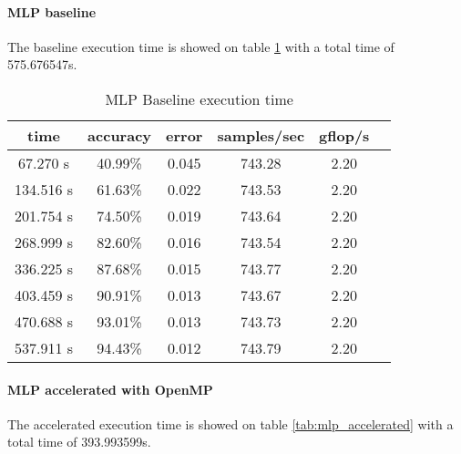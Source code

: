 \documentclass[11pt]{article}
\begin{document}
\paragraph*{MLP baseline} The baseline execution time is showed on table \ref{tab:mlp_baseline} with a total time of 575.676547s.

\begin{table}[h]	\centering
	\begin{tabular}{|c|c|c|c|c|c|}
		\hline
		\textbf{time} & \textbf{accuracy} & \textbf{error} & \textbf{samples/sec} & \textbf{gflop/s} \\ \hline
		67.270 s      & 40.99\%           & 0.045          & 743.28               & 2.20             \\ \hline
		134.516 s     & 61.63\%           & 0.022          & 743.53               & 2.20             \\ \hline
		201.754 s     & 74.50\%           & 0.019          & 743.64               & 2.20             \\ \hline
		268.999 s     & 82.60\%           & 0.016          & 743.54               & 2.20             \\ \hline
		336.225 s     & 87.68\%           & 0.015          & 743.77               & 2.20             \\ \hline
		403.459 s     & 90.91\%           & 0.013          & 743.67               & 2.20             \\ \hline
		470.688 s     & 93.01\%           & 0.013          & 743.73               & 2.20             \\ \hline
		537.911 s     & 94.43\%           & 0.012          & 743.79               & 2.20             \\ \hline
	\end{tabular}
	\caption{MLP Baseline execution time}
	\label{tab:mlp_baseline}
\end{table}

\paragraph*{MLP accelerated with OpenMP} The accelerated execution time is showed on table \ref{tab:mlp_accelerated} with a total time of 393.993599s.
\end{document}
